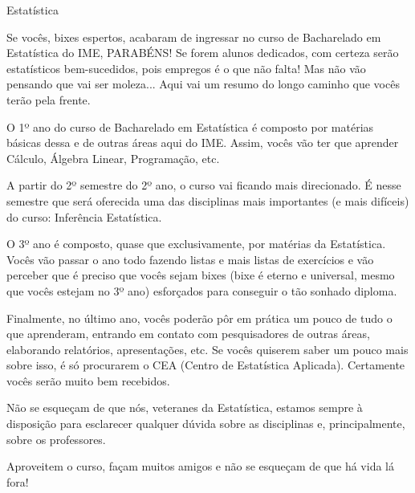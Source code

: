 \begin{subsecao}{Estatística}

Se vocês, bixes espertos, acabaram de ingressar no curso de Bacharelado em
Estatística do IME, PARABÉNS! Se forem alunos dedicados, com certeza serão
estatísticos bem-sucedidos, pois empregos é o que não falta! Mas não vão
pensando que vai ser moleza... Aqui vai um resumo do longo caminho que vocês
terão pela frente.

O 1º ano do curso de Bacharelado em Estatística é composto por matérias básicas
dessa e de outras áreas aqui do IME. Assim, vocês vão ter que aprender Cálculo,
Álgebra Linear, Programação, etc.

A partir do 2º semestre do 2º ano, o curso vai ficando mais direcionado. É nesse
semestre que será oferecida uma das disciplinas mais importantes (e mais
difíceis) do curso: Inferência Estatística.

O 3º ano é composto, quase que exclusivamente, por matérias da
Estatística. Vocês vão passar o ano todo fazendo listas e mais listas de
exercícios e vão perceber que é preciso que vocês sejam bixes (bixe é eterno e
universal, mesmo que vocês estejam no 3º ano) esforçados para conseguir o tão
sonhado diploma.

Finalmente, no último ano, vocês poderão pôr em prática um pouco de tudo o que
aprenderam, entrando em contato com pesquisadores de outras áreas, elaborando
relatórios, apresentações, etc. Se vocês quiserem saber um pouco mais sobre
isso, é só procurarem o CEA (Centro de Estatística Aplicada). Certamente vocês
serão muito bem recebidos.

Não se esqueçam de que nós, veteranes da Estatística, estamos sempre à
disposição para esclarecer qualquer dúvida sobre as disciplinas e,
principalmente, sobre os professores.

Aproveitem o curso, façam muitos amigos e não se esqueçam de que há vida lá
fora!

\end{subsecao}
